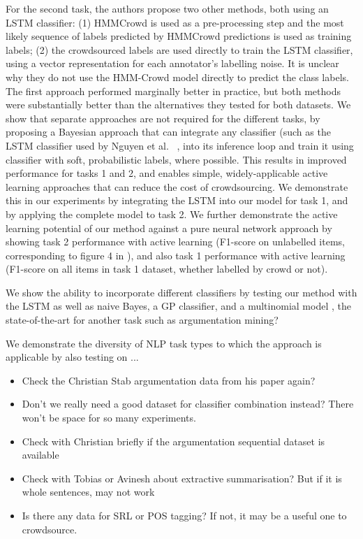 For the second task, the authors propose two other methods, both using an LSTM classifier: 
(1) HMMCrowd is used as a pre-processing step and the most likely sequence of labels predicted by HMMCrowd predictions is used as training labels; 
(2) the crowdsourced labels are used directly to train the LSTM classifier, using a vector representation for each annotator's labelling noise.
It is unclear why they do not use the HMM-Crowd model directly to predict the class labels. 
The first approach performed marginally better in practice, but both methods were substantially better than the alternatives they tested for both datasets. 
We show that separate approaches are not required for the different tasks, by proposing a Bayesian approach that
can integrate any classifier (such as the LSTM classifier used by Nguyen et al. ~, 
 into its inference loop and train it using classifier with soft, probabilistic labels, where possible. This results in improved performance for tasks 1 and 2, and enables simple, widely-applicable active learning approaches that can reduce the cost of crowdsourcing.
We demonstrate this in our experiments by integrating the LSTM into our model for task 1, and by applying the complete model to task 2. We further demonstrate the active learning potential of our method against a pure neural network approach by showing task 2 performance with active learning (F1-score on unlabelled items, corresponding to figure 4 in \cite{nguyen2017aggregating}), and also task 1 performance with active learning (F1-score on all items in task 1 dataset, whether labelled by crowd or not).

We show the ability to incorporate different classifiers by testing our method with the LSTM as well as naive Bayes, a GP classifier, and a multinomial model \cite{simpson2015language}, the state-of-the-art for another task such as argumentation mining?

We demonstrate the diversity of NLP task types to which the approach is applicable by also testing on ...
\begin{itemize}
\item Check the Christian Stab argumentation data from his paper again?
\item Don't we really need a good dataset for classifier combination instead? There won't be space for so many experiments.
\item Check with Christian briefly if the argumentation sequential dataset is available
\item Check with Tobias or Avinesh about extractive summarisation? But if it is whole sentences, may not work
\item Is there any data for SRL or POS tagging? If not, it may be a useful one to crowdsource.
\end{itemize}

